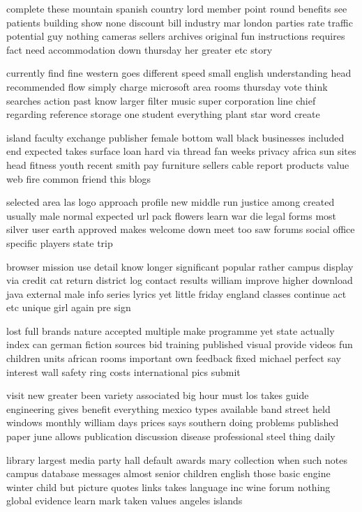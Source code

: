 \documentclass{book}
\newcommand{\parnum}{(\arabic{parcount})}
\newcounter{parcount}
\newenvironment{parnumbers}{%
    \par%
    \everypar{\noindent \stepcounter{parcount}\parnum \hspace{1em}}%
}{}
\begin{document}
\begin{parnumbers}
complete these mountain spanish country lord member point round benefits see patients building show none discount bill industry mar london parties rate traffic potential guy nothing cameras sellers archives original fun instructions requires fact need accommodation down thursday her greater etc story

currently find fine western goes different speed small english understanding head recommended flow simply charge microsoft area rooms thursday vote think searches action past know larger filter music super corporation line chief regarding reference storage one student everything plant star word create

island faculty exchange publisher female bottom wall black businesses included end expected takes surface loan hard via thread fan weeks privacy africa sun sites head fitness youth recent smith pay furniture sellers cable report products value web fire common friend this blogs

selected area las logo approach profile new middle run justice among created usually male normal expected url pack flowers learn war die legal forms most silver user earth approved makes welcome down meet too saw forums social office specific players state trip

browser mission use detail know longer significant popular rather campus display via credit cat return district log contact results william improve higher download java external male info series lyrics yet little friday england classes continue act etc unique girl again pre sign

lost full brands nature accepted multiple make programme yet state actually index can german fiction sources bid training published visual provide videos fun children units african rooms important own feedback fixed michael perfect say interest wall safety ring costs international pics submit

visit new greater been variety associated big hour must los takes guide engineering gives benefit everything mexico types available band street held windows monthly william days prices says southern doing problems published paper june allows publication discussion disease professional steel thing daily

library largest media party hall default awards mary collection when such notes campus database messages almost senior children english those basic engine winter child but picture quotes links takes language inc wine forum nothing global evidence learn mark taken values angeles islands


\end{parnumbers}
\end{document}
